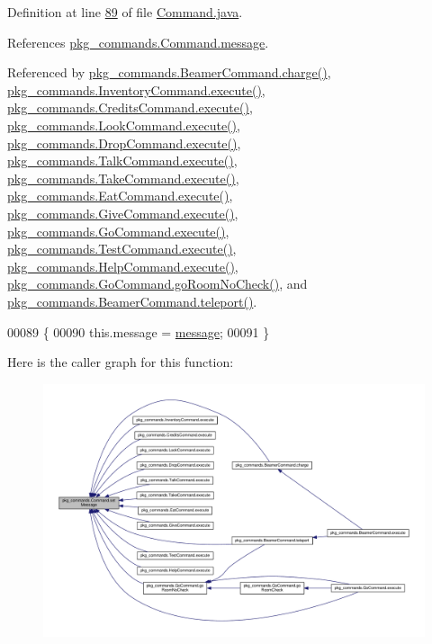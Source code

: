 Definition at line \hyperlink{Command_8java_source_l00089}{89} of file \hyperlink{Command_8java_source}{Command.\-java}.



References \hyperlink{Command_8java_source_l00035}{pkg\-\_\-commands.\-Command.\-message}.



Referenced by \hyperlink{BeamerCommand_8java_source_l00067}{pkg\-\_\-commands.\-Beamer\-Command.\-charge()}, \hyperlink{InventoryCommand_8java_source_l00023}{pkg\-\_\-commands.\-Inventory\-Command.\-execute()}, \hyperlink{CreditsCommand_8java_source_l00023}{pkg\-\_\-commands.\-Credits\-Command.\-execute()}, \hyperlink{LookCommand_8java_source_l00026}{pkg\-\_\-commands.\-Look\-Command.\-execute()}, \hyperlink{DropCommand_8java_source_l00027}{pkg\-\_\-commands.\-Drop\-Command.\-execute()}, \hyperlink{TalkCommand_8java_source_l00027}{pkg\-\_\-commands.\-Talk\-Command.\-execute()}, \hyperlink{TakeCommand_8java_source_l00027}{pkg\-\_\-commands.\-Take\-Command.\-execute()}, \hyperlink{EatCommand_8java_source_l00028}{pkg\-\_\-commands.\-Eat\-Command.\-execute()}, \hyperlink{GiveCommand_8java_source_l00029}{pkg\-\_\-commands.\-Give\-Command.\-execute()}, \hyperlink{GoCommand_8java_source_l00032}{pkg\-\_\-commands.\-Go\-Command.\-execute()}, \hyperlink{TestCommand_8java_source_l00032}{pkg\-\_\-commands.\-Test\-Command.\-execute()}, \hyperlink{HelpCommand_8java_source_l00033}{pkg\-\_\-commands.\-Help\-Command.\-execute()}, \hyperlink{GoCommand_8java_source_l00071}{pkg\-\_\-commands.\-Go\-Command.\-go\-Room\-No\-Check()}, and \hyperlink{BeamerCommand_8java_source_l00050}{pkg\-\_\-commands.\-Beamer\-Command.\-teleport()}.


\begin{DoxyCode}
00089                                               \{
00090         this.message = \hyperlink{classpkg__commands_1_1Command_ab4bc9d76fd948fcf253400793fbfde3f}{message};
00091     \}
\end{DoxyCode}


Here is the caller graph for this function\-:
\nopagebreak
\begin{figure}[H]
\begin{center}
\leavevmode
\includegraphics[width=350pt]{classpkg__commands_1_1Command_ae210ff216fe908b111ba1c988a963d13_icgraph}
\end{center}
\end{figure}


